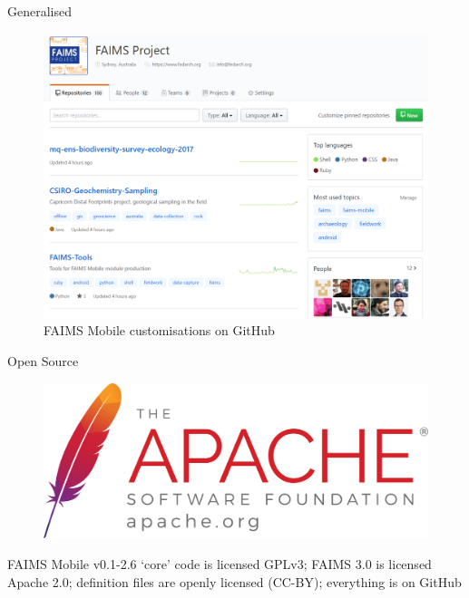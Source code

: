 \begin{frame}{Generalised}
 \begin{figure}[H]
    \centering
        \vspace{-0.5cm}

        \includegraphics[height=.75\textheight]{figures/FAIMS-generalised.png}
        \caption{FAIMS Mobile customisations on GitHub}
        \label{fig:FAIMS-github}
 \end{figure}
\end{frame}



\begin{frame}{Open Source}
 \begin{figure}[H]
    \centering
        \includegraphics[width=.65\textwidth]{figures/asf_logo_url.png}
        
        \label{fig:FAIMS-github-OSS}
 \end{figure}
 
FAIMS Mobile v0.1-2.6 `core' code is licensed GPLv3; FAIMS 3.0 is licensed Apache 2.0; definition files are openly licensed (CC-BY); everything is on GitHub 

\end{frame}


